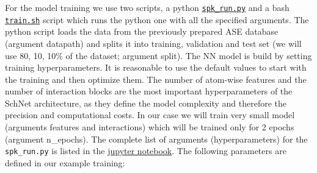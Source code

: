 For the model training we use two scripts, a python \href{https://github.com/LierB/gromos_tutorial_livecoms/blob/burnn_tutorial_rc/tutorial_files/t_06/train_dataset_tutorial/spk_run.py}{\texttt{spk\_run.py}} and a bash \href{https://github.com/LierB/gromos_tutorial_livecoms/blob/burnn_tutorial_rc/tutorial_files/t_06/train_dataset_tutorial/train.sh}{\texttt{train.sh}} script which runs the python one with all the specified arguments. The python script loads the data from the previously prepared ASE database (argument datapath) and splits it into training, validation and test set (we will use 80, 10, 10\% of the dataset; argument split). The NN model is build by setting training hyperparameters. It is reasonable to use the default values to start with the training and then optimize them. The number of atom-wise features and the number of interaction blocks are the most important hyperparameters of the SchNet architecture, as they define the model complexity and therefore the precision and computational costs. In our case we will train very small model (arguments features and interactions) which will be trained only for 2 epochs (argument n\_epochs). The complete list of arguments (hyperparameters) for the \texttt{spk\_run.py} is listed in the \href{https://github.com/LierB/gromos_tutorial_livecoms/blob/burnn_tutorial_rc/tutorial_files/t_06/train_dataset_tutorial/tutorial_v2.ipynb}{jupyter notebook}. The following parameters are defined in our example training:
